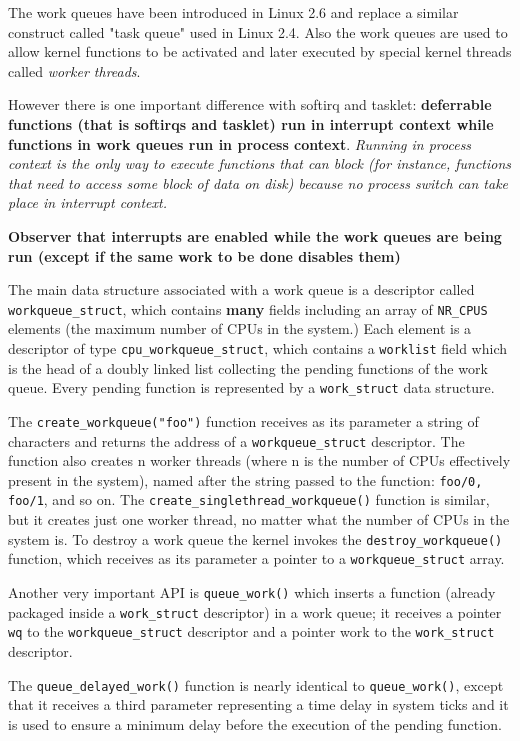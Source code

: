 \documentclass[10pt,a4paper]{article}
\begin{document}
The work queues have been introduced in Linux 2.6 and replace a similar construct called "task queue" used in Linux 2.4. Also the work queues are used to allow kernel functions to be activated and later executed by special kernel threads called \textit{worker threads}. 

However there is one important difference with softirq and tasklet: \textbf{deferrable functions (that is softirqs and tasklet) run in interrupt context while functions in work queues run in process context}. \textit{Running in process context is the only way to execute functions that can block (for instance, functions that need to access some block of data on disk) because no process switch can take place in interrupt context.}

\textbf{Observer that interrupts are enabled while the work queues are being run (except if the same work to be done disables them)}

The main data structure associated with a work queue is a descriptor called \texttt{workqueue\_struct}, which contains \textbf{many} fields including an array of \texttt{NR\_CPUS} elements (the maximum number of CPUs in the system.) Each element is a descriptor of type \texttt{cpu\_workqueue\_struct}, which contains a \texttt{worklist} field which is the head of a doubly linked list collecting the pending functions of the work queue. Every pending function is represented by a \texttt{work\_struct} data structure.

The \texttt{create\_workqueue("foo")} function receives as its parameter a string of characters and returns the address of a \texttt{workqueue\_struct} descriptor. The function also creates n worker threads (where n is the number of CPUs effectively present in the system), named after the string passed to the function: \texttt{foo/0, foo/1}, and so on. The \texttt{create\_singlethread\_workqueue()} function is similar, but it creates just one worker thread, no matter what the number of CPUs in the system is. To destroy a work queue the kernel invokes the \texttt{destroy\_workqueue()} function, which receives as its parameter a pointer to a \texttt{workqueue\_struct} array.

Another very important API is \texttt{queue\_work()} which inserts a function (already packaged inside a \texttt{work\_struct} descriptor) in a work queue; it receives a pointer \texttt{wq} to the \texttt{workqueue\_struct} descriptor and a pointer work to the \texttt{work\_struct} descriptor.

The \texttt{queue\_delayed\_work()} function is nearly identical to \texttt{queue\_work()}, except that it
receives a third parameter representing a time delay in system ticks and it is used to ensure a minimum delay before the execution of the pending function.
\end{document}
